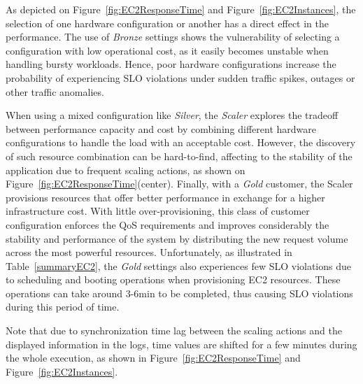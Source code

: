 As depicted on Figure~\ref{fig:EC2ResponseTime} and Figure~\ref{fig:EC2Instances}, the selection of one hardware configuration or another has a direct effect in the performance. The use of \emph{Bronze} settings shows the vulnerability of selecting a configuration with low operational cost, as it easily becomes unstable when handling bursty workloads. Hence, poor hardware configurations increase the probability of experiencing SLO violations under sudden traffic spikes, outages or other traffic anomalies. 

When using a mixed configuration like \emph{Silver}, the \emph{Scaler} explores the tradeoff between performance capacity and cost by combining different hardware configurations to handle the load with an acceptable cost. However, the discovery of such resource combination can be hard-to-find, affecting to the stability of the application due to frequent scaling actions, as shown on Figure~\ref{fig:EC2ResponseTime}(center). Finally, with a \emph{Gold} customer, the Scaler provisions resources that offer better performance in exchange for a higher infrastructure cost. With little over-provisioning, this class of customer configuration enforces the QoS requirements and improves considerably the stability and performance of the system by distributing the new request volume across the most powerful resources. Unfortunately, as illustrated in Table~\ref{summaryEC2}, the \emph{Gold} settings also experiences few SLO violations due to scheduling and booting operations when provisioning EC2 resources. These operations can take around 3-6min to be completed, thus causing SLO violations during this period of time.

Note that due to synchronization time lag between the scaling actions and the displayed information in the logs, time values are shifted for a few minutes during the whole execution, as shown in Figure~\ref{fig:EC2ResponseTime} and Figure~\ref{fig:EC2Instances}.







